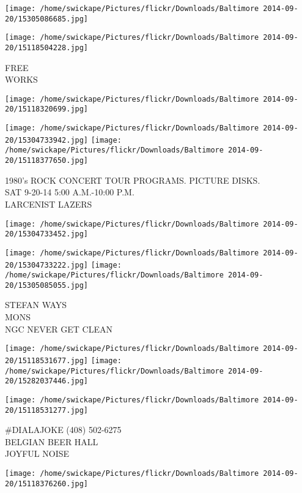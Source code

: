 \documentclass[10pt,letterpaper]{article}
\begin{document}
\texttt{[image: /home/swickape/Pictures/flickr/Downloads/Baltimore 2014-09-20/15305086685.jpg]}

\vspace{0.25in}
\texttt{[image: /home/swickape/Pictures/flickr/Downloads/Baltimore 2014-09-20/15118504228.jpg]}

FREE\\
WORKS
\pagebreak

\texttt{[image: /home/swickape/Pictures/flickr/Downloads/Baltimore 2014-09-20/15118320699.jpg]}

\vspace{0.25in}
\texttt{[image: /home/swickape/Pictures/flickr/Downloads/Baltimore 2014-09-20/15304733942.jpg]}
\texttt{[image: /home/swickape/Pictures/flickr/Downloads/Baltimore 2014-09-20/15118377650.jpg]}

1980's ROCK CONCERT TOUR PROGRAMS.  PICTURE DISKS.\\
SAT 9{-}20{-}14 5:00 A.M.{-}10:00 P.M.\\
LARCENIST LAZERS
\pagebreak

\texttt{[image: /home/swickape/Pictures/flickr/Downloads/Baltimore 2014-09-20/15304733452.jpg]}

\vspace{0.25in}
\texttt{[image: /home/swickape/Pictures/flickr/Downloads/Baltimore 2014-09-20/15304733222.jpg]}
\texttt{[image: /home/swickape/Pictures/flickr/Downloads/Baltimore 2014-09-20/15305085055.jpg]}

STEFAN WAYS\\
MONS\\
NGC NEVER GET CLEAN
\pagebreak

\texttt{[image: /home/swickape/Pictures/flickr/Downloads/Baltimore 2014-09-20/15118531677.jpg]}
\texttt{[image: /home/swickape/Pictures/flickr/Downloads/Baltimore 2014-09-20/15282037446.jpg]}

\texttt{[image: /home/swickape/Pictures/flickr/Downloads/Baltimore 2014-09-20/15118531277.jpg]}

\#DIALAJOKE (408) 502{-}6275\\
BELGIAN BEER HALL\\
JOYFUL NOISE
\pagebreak

\texttt{[image: /home/swickape/Pictures/flickr/Downloads/Baltimore 2014-09-20/15118376260.jpg]}
\end{document}
